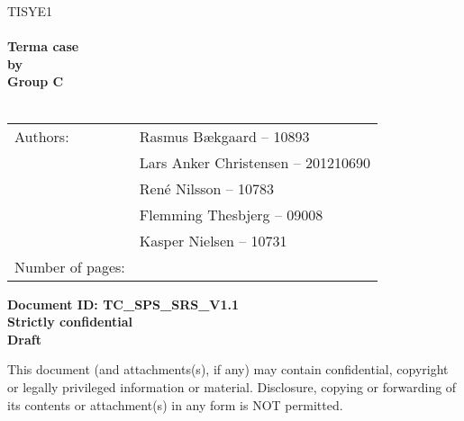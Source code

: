 \documentclass[Main]{subfiles}
\begin{document}
\begin{center}

\textsc{\Large TISYE1}\\[0.5cm]


\HRule \\[0.4cm]

{ \huge \bfseries Terma case}\\[0.4cm]
{ \huge \bfseries by}\\[0.4cm] 
{ \huge \bfseries Group C}\\[0.4cm]

\HRule \\[1.5cm]

\begin{tabular}{p{}|p{}}
\hline 
Authors: & Rasmus Bækgaard -- 10893\\ &Lars Anker Christensen -- 201210690\\ &René Nilsson -- 10783\\ &Flemming Thesbjerg -- 09008\\ &Kasper Nielsen -- 10731\\ 
\hline 
Number of pages: & \pageref{LastPage} \\
\hline 
\end{tabular} 

\textbf{\Large Document ID: TC\_SPS\_SRS\_V1.1}\\
\textbf{\Large Strictly confidential}\\
\textbf{\Large Draft}

This document (and attachments(s), if any) may contain confidential, copyright or legally privileged information or material.
Disclosure, copying or forwarding of its contents or attachment(s) in any form is NOT permitted.
\end{center}
\end{document}
